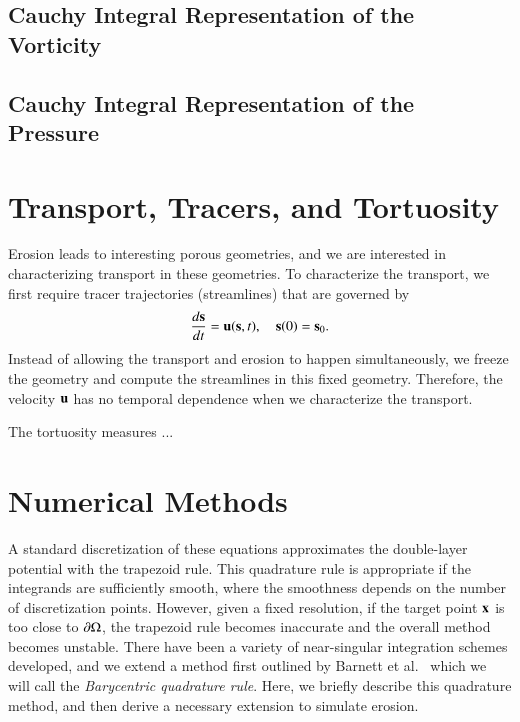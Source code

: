 \documentclass[preprint, 10pt]{elsarticle}
\begin{document}
\subsection{Cauchy Integral Representation of the Vorticity}

\subsection{Cauchy Integral Representation of the Pressure}




\section{Transport, Tracers, and Tortuosity}
Erosion leads to interesting porous geometries, and we are interested in
characterizing transport in these geometries.  To characterize the
transport, we first require tracer trajectories (streamlines) that are
governed by
\begin{align}
  \frac{d{\mathbf{s}}}{dt} = {\mathbf{u}}({\mathbf{s}},t), \quad {\mathbf{s}}(0) = {\mathbf{s}}_0.
\end{align}
Instead of allowing the transport and erosion to happen simultaneously,
we freeze the geometry and compute the streamlines in this fixed
geometry.  Therefore, the velocity ${\mathbf{u}}$ has no temporal dependence when
we characterize the transport.

The tortuosity measures ...


\section{Numerical Methods}
\label{s:method}
A standard discretization of these equations approximates the
double-layer potential with the trapezoid rule.  This quadrature rule is
appropriate if the integrands are sufficiently smooth, where the
smoothness depends on the number of discretization points.  However,
given a fixed resolution, if the target point ${\mathbf{x}}$ is too close to ${\partial}
\Omega$, the trapezoid rule becomes inaccurate and the overall method
becomes unstable.  There have been a variety of near-singular
integration schemes developed, and we extend a method first outlined by
Barnett et al.~\cite{bar-wu-vee2015} which we will call the {\em
Barycentric quadrature rule}.  Here, we briefly describe this quadrature
method, and then derive a necessary extension to simulate erosion.
\end{document}
